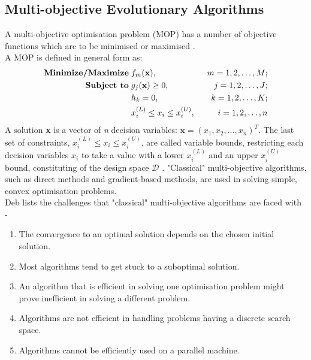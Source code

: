 \documentclass[sigconf,nonacm]{acmart}
\begin{document}
\subsection{Multi-objective Evolutionary Algorithms}
A multi-objective optimisation problem (MOP) has a number of objective functions which are to be minimised or maximised \cite{deb2001}.\\ A MOP is defined in general form as:
\begin{align*}
	\textbf{Minimize/Maximize} \hspace{0.1cm}
    & f_m(\textbf{x}), \hspace{0.2cm}
    & m = 1, 2, \ldots, M; \\
    \textbf{Subject to} \hspace{0.1cm}
    & g_{j}(\textbf{x}) \ge 0, \hspace{0.2cm}
    & j = 1, 2, \ldots, J; \\
    & h_{k} = 0, \hspace{0.2cm}
    & k = 1, 2, \ldots, K; \\
    & x_{i}^{(L)} \le x_{i} \le x_{i}^{(U)}, \hspace{0.2cm}
    & i = 1, 2, \ldots, n
\end{align*}
A solution \textbf{x} is a vector of \textit{n} decision variables: $\textbf{x} = (x_{1}, x_{2}, \ldots, x_{n})^{T}$. The last set of constraints, $x_{i}^{(L)} \le x_{i} \le x_{i}^{(U)}$, are called variable bounds, restricting each decision variables $x_{i}$ to take a value with a lower $x_{i}^{(L)}$ and an upper $x_{i}^{(U)}$ bound, constituting of the design space $\mathcal{D}$ \cite{deb2002}. "Classical" multi-objective algorithms, such as direct methods and gradient-based methods, are used in solving simple, convex optimisation problems.\\
Deb \cite{deb2002} lists the challenges that "classical" multi-objective algorithms are faced with -
\begin{enumerate}
\item The convergence to an optimal solution depends on the chosen initial solution.
\item Most algorithms tend to get stuck to a suboptimal solution.
\item An algorithm that is efficient in solving one optimisation problem might prove inefficient in solving a different problem.
\item Algorithms are not efficient in handling problems having a discrete search space.
\item Algorithms cannot be efficiently used on a parallel machine.
\end{enumerate}
\end{document}
